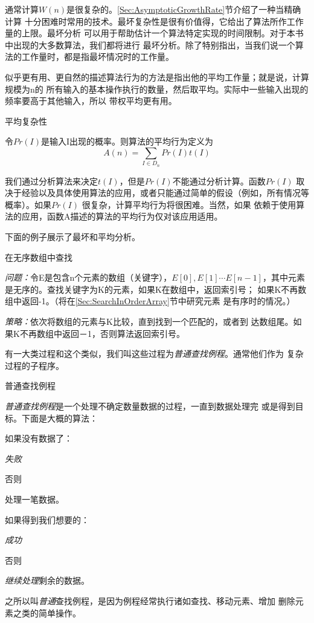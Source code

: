 通常计算$W(n)$是很复杂的。\ref{Sec:AsymptoticGrowthRate}节介绍了一种当精确计算
十分困难时常用的技术。最坏复杂性是很有价值得，它给出了算法所作工作量的上限。最坏分析
可以用于帮助估计一个算法特定实现的时间限制。对于本书中出现的大多数算法，我们都将进行
最坏分析。除了特别指出，当我们说一个算法的工作量时，都是指最坏情况时的工作量。

似乎更有用、更自然的描述算法行为的方法是指出他的平均工作量；就是说，计算规模为n的
所有输入的基本操作执行的数量，然后取平均。实际中一些输入出现的频率要高于其他输入，所以
带权平均更有用。
\begin{definition}
平均复杂性

令$Pr(I)$是输入I出现的概率。则算法的平均行为定义为
\begin{displaymath}
    A(n)=\sum_{I\in D_n}Pr(I)t(I)
\end{displaymath}
\end{definition}

我们通过分析算法来决定$t(I)$，但是$Pr(I)$不能通过分析计算。函数$Pr(I)$
取决于经验以及具体使用算法的应用，或者只能通过简单的假设（例如，所有情况等概率）。如果$Pr(I)$
很复杂，计算平均行为将很困难。当然，如果
依赖于使用算法的应用，函数A描述的算法的平均行为仅对该应用适用。

下面的例子展示了最坏和平均分析。

\begin{example}\label{Example:SearchInUnSortedArray}
在无序数组中查找

\emph{问题：}令E是包含n个元素的数组（关键字），$E[0],E[1] \cdots
E[n-1]$，其中元素是无序的。查找关键字为K的元素，如果K在数组中，返回索引号；
如果K不再数组中返回-1。（将在\ref{Sec:SearchInOrderArray}节中研究元素
是有序时的情况。）

\emph{策略：}依次将数组的元素与K比较，直到找到一个匹配的，或者到
达数组尾。如果K不再数组中返回－1，否则算法返回索引号。
\end{example}

有一大类过程和这个类似，我们叫这些过程为\emph{普通查找例程}。通常他们作为
复杂过程的子程序。

\begin{definition}\label{Def:GeneralSearch}
普通查找例程

\emph{普通查找例程}是一个处理不确定数量数据的过程，一直到数据处理完
或是得到目标。下面是大概的算法：

如果没有数据了：

\hspace{2ex}\emph{失败}

否则

\hspace{2ex}处理一笔数据。

\hspace{2ex}如果得到我们想要的：

\hspace{4ex}\emph{成功}

\hspace{2ex}否则

\hspace{4ex}\emph{继续处理}剩余的数据。

之所以叫\emph{普通}查找例程，是因为例程经常执行诸如查找、移动元素、增加
删除元素之类的简单操作。
\end{definition}

